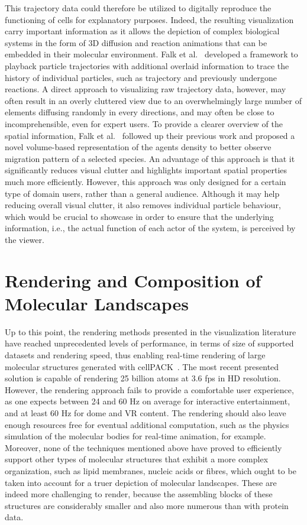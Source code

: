 This trajectory data could therefore be utilized to digitally reproduce the functioning of cells for explanatory purposes.
Indeed, the resulting visualization carry important information as it allows the depiction of complex biological systems in the form of 3D diffusion and reaction animations that can be embedded in their molecular environment.
Falk et al.~\cite{falk2009visualization} developed a framework to playback particle trajectories with additional overlaid information to trace the history of individual particles, such as trajectory and previously undergone reactions.
A direct approach to visualizing raw trajectory data, however, may often result in an overly cluttered view due to an overwhelmingly large number of elements diffusing randomly in every directions, and may often be close to incomprehensible, even for expert users.
To provide a clearer overview of the spatial information, Falk et al.~\cite{falk20103d} followed up their previous work and proposed a novel volume-based representation of the agents density to better observe migration pattern of a selected species.
An advantage of this approach is that it significantly reduces visual clutter and highlights important spatial properties much more efficiently.
However, this approach was only designed for a certain type of domain users, rather than a general audience.
Although it may help reducing overall visual clutter, it also removes individual particle behaviour, which would be crucial to showcase in order to ensure that the underlying information, i.e., the actual function of each actor of the system, is perceived by the viewer.

\section{Rendering and Composition of Molecular Landscapes}
\label{sec:section3}

Up to this point, the rendering methods presented in the visualization literature have reached unprecedented levels of performance, in terms of size of supported datasets and rendering speed, thus enabling real-time rendering of large molecular structures generated with cellPACK~\cite{johnson2015cellpack}.
The most recent presented solution is capable of rendering 25 billion atoms at 3.6 fps in HD resolution.
However, the rendering approach fails to provide a comfortable user experience, as one expects between 24 and 60 Hz on average for interactive entertainment, and at least 60 Hz for dome and VR content.
The rendering should also leave enough resources free for eventual additional computation, such as the physics simulation of the molecular bodies for real-time animation, for example.
Moreover, none of the techniques mentioned above have proved to efficiently support other types of molecular structures that exhibit a more complex organization, such as lipid membranes, nucleic acids or fibres, which ought to be taken into account for a truer depiction of molecular landscapes.
These are indeed more challenging to render, because the assembling blocks of these structures are considerably smaller and also more numerous than with protein data.

